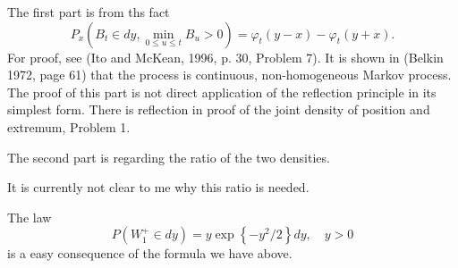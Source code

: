 \begin{tcolorbox}[breakable,title=Law of Brownian Meander,colback=yellow!10,colframe=black,]

    The first part is from ths fact
        \[
        P_x\left(B_t \in dy, \min _{0 \leq u \leq t} B_u>0\right)  = \varphi_t(y-x)-\varphi_t(y+x).
        \]
    For proof, see (Ito and McKean, 1996, p. 30, Problem 7). It is shown in (Belkin 1972, page 61) that the process is continuous, non-homogeneous Markov process. 
    {\color{blue} The proof of this part is not direct application of the reflection principle in its simplest form. There is reflection in proof of the joint density of position and extremum, Problem 1.}

    The second part is regarding the ratio of the two densities. 

    {\color{red} It is currently not clear to me why this ratio is needed.}

    The law
    \[
        P\left(W_1^{+} \in d y\right)=y \exp \left\{-y^2 / 2\right\} d y, \quad y>0
    \]
    is a easy consequence of the formula we have above.
\end{tcolorbox}






